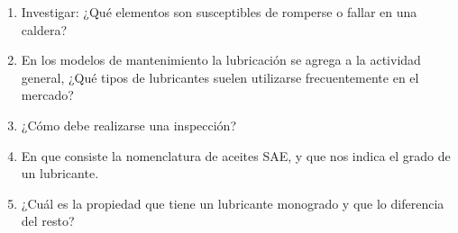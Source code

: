 \begin{enumerate}
\begin{enumerate}
  \end{enumerate}
    
    \item Investigar: ¿Qué elementos son susceptibles de romperse o fallar en una caldera?
    \item En los modelos de mantenimiento la lubricación se agrega a la actividad general, ¿Qué tipos de lubricantes suelen utilizarse frecuentemente en el mercado? 
    \item ¿Cómo debe realizarse una inspección?
    \item  En que consiste la nomenclatura de aceites SAE, y que nos indica el grado de un lubricante.
    \item ¿Cuál es la propiedad que tiene un lubricante monogrado y que lo diferencia del resto?
    
    
\end{enumerate}
